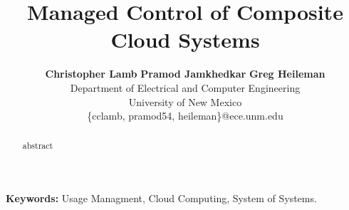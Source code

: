 \documentclass[times, 10pt,twocolumn]{article}
\begin{document}
%
\title{Managed Control of Composite Cloud Systems}



\author{
        \textbf{Christopher Lamb}\hspace*{0.3in}
        \textbf{Pramod Jamkhedkar}\hspace*{0.3in}
        \textbf{Greg Heileman}\\
        Department of Electrical and Computer Engineering \\
        University of New Mexico \\
        \small{\{cclamb, pramod54, heileman\}@ece.unm.edu}
}

\maketitle

\begin{abstract}
abstract
\end{abstract}

\textbf{Keywords:} Usage Managment, Cloud Computing, System of Systems.


\end{document}

